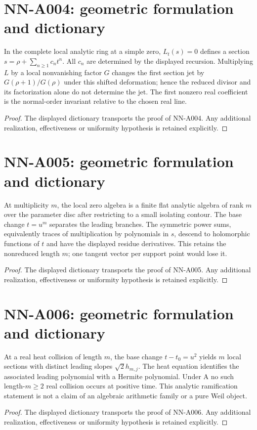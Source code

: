 \section{NN-A004: geometric formulation and dictionary}
\begin{geometricstatement}[NN-A004]
In the complete local analytic ring at a simple zero, $L_t(s)=0$ defines a section $s=\rho+\sum_{n\ge1}c_nt^n$. All $c_n$ are determined by the displayed recursion. Multiplying $L$ by a local nonvanishing factor $G$ changes the first section jet by $G(\rho+1)/G(\rho)$ under this shifted deformation; hence the reduced divisor and its factorization alone do not determine the jet. The first nonzero real coefficient is the normal-order invariant relative to the chosen real line.
\end{geometricstatement}
\begin{proof} The displayed dictionary transports the proof of NN-A004. Any additional realization, effectiveness or uniformity hypothesis is retained explicitly.\end{proof}


\section{NN-A005: geometric formulation and dictionary}
\begin{geometricstatement}[NN-A005]
At multiplicity $m$, the local zero algebra is a finite flat analytic algebra of rank $m$ over the parameter disc after restricting to a small isolating contour. The base change $t=u^m$ separates the leading branches. The symmetric power sums, equivalently traces of multiplication by polynomials in $s$, descend to holomorphic functions of $t$ and have the displayed residue derivatives. This retains the nonreduced length $m$; one tangent vector per support point would lose it.
\end{geometricstatement}
\begin{proof} The displayed dictionary transports the proof of NN-A005. Any additional realization, effectiveness or uniformity hypothesis is retained explicitly.\end{proof}


\section{NN-A006: geometric formulation and dictionary}
\begin{geometricstatement}[NN-A006]
At a real heat collision of length $m$, the base change $t-t_0=u^2$ yields $m$ local sections with distinct leading slopes $\sqrt2 h_{m,j}$. The heat equation identifies the associated leading polynomial with a Hermite polynomial. Under A no such length-$m\ge2$ real collision occurs at positive time. This analytic ramification statement is not a claim of an algebraic arithmetic family or a pure Weil object.
\end{geometricstatement}
\begin{proof} The displayed dictionary transports the proof of NN-A006. Any additional realization, effectiveness or uniformity hypothesis is retained explicitly.\end{proof}


